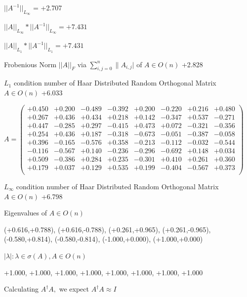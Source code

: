 \documentclass[9pt]{article}
\theoremstyle{plain}
\theoremstyle{definition}
\theoremstyle{remark}
\numberwithin{equation}{section}
\begin{document}
$||A^{-1}||_{L_{\infty}}$ = +2.707

$||A||_{L_{\infty}} * ||A^{-1}||_{L_{\infty}} = +7.431$

$||A||_{L_1} * ||A^{-1}||_{L_1} = +7.431$

Frobenious Norm  $||A||_{\textit{F}}$ via $\sum\limits_{i,j =0}^{n} \|A_{i,j}|$   of  $A \in O(n)$  +2.828

$L_1$ condition number of Haar Distributed Random Orthogonal Matrix $A \in O(n)$ +6.033

$A = \left(
\begin{array}{
cccccccc}
+0.450 & +0.200 & -0.489 & -0.392 & +0.200 & -0.220 & +0.216 & +0.480 \\
+0.267 & +0.436 & +0.434 & +0.218 & +0.142 & -0.347 & +0.537 & -0.271 \\
+0.447 & -0.285 & +0.297 & -0.415 & +0.473 & +0.072 & -0.321 & -0.356 \\
+0.254 & +0.436 & +0.187 & -0.318 & -0.673 & -0.051 & -0.387 & -0.058 \\
+0.396 & -0.165 & -0.576 & +0.358 & -0.213 & -0.112 & -0.032 & -0.544 \\
-0.116 & -0.567 & +0.140 & -0.236 & -0.296 & -0.692 & +0.148 & +0.034 \\
+0.509 & -0.386 & +0.284 & +0.235 & -0.301 & +0.410 & +0.261 & +0.360 \\
+0.179 & +0.037 & +0.129 & +0.535 & +0.199 & -0.404 & -0.567 & +0.373 \\
\end{array}
\right)$ \newline 

$L_{\infty}$ condition number of Haar Distributed Random Orthogonal Matrix $A \in O(n)$ +6.798

Eigenvalues of $A \in O(n)$

(+0.616,+0.788), (+0.616,-0.788), (+0.261,+0.965), (+0.261,-0.965), (-0.580,+0.814), (-0.580,-0.814), (-1.000,+0.000), (+1.000,+0.000)

 $|\lambda | : \lambda \in \sigma(A) , A \in O(n)$

+1.000, +1.000, +1.000, +1.000, +1.000, +1.000, +1.000, +1.000


Calculating $A^{\dag} A,$  we expect $A^{\dag} A \approx I$
\end{document}
